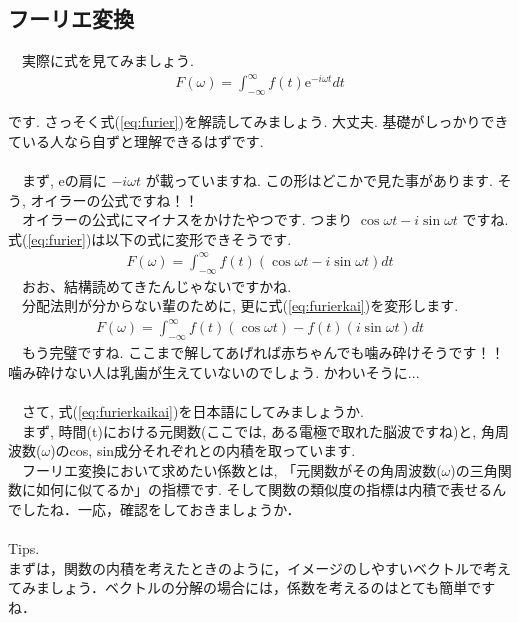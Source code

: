\documentclass[11pt,a4paper,uplatex]{ujreport} 	%
\begin{document}
\subsection{フーリエ変換} 
　実際に式を見てみましょう.\\
\begin{eqnarray}
F(\omega) = \int_{-\infty}^{\infty} f(t)\mathrm{e}^{-i\omega t} dt
\label{eq:furier}
\end{eqnarray}

です. さっそく式(\ref{eq:furier})を解読してみましょう. 大丈夫. 基礎がしっかりできている人なら自ずと理解できるはずです.\\
\\
　まず, eの肩に $ -i\omega t $ が載っていますね. この形はどこかで見た事があります. そう, オイラーの公式ですね！！\\
　オイラーの公式にマイナスをかけたやつです. つまり $ \cos\omega t  - i\sin\omega t $ ですね. \\
式(\ref{eq:furier})は以下の式に変形できそうです.\\
\begin{eqnarray}
F(\omega) = \int_{-\infty}^{\infty} f(t)(\cos\omega t - i\sin\omega t) dt
\label{eq:furierkai}
\end{eqnarray}
　おお、結構読めてきたんじゃないですかね.\\
　分配法則が分からない輩のために, 更に式(\ref{eq:furierkai})を変形します.\\
\begin{eqnarray}
F(\omega) = \int_{-\infty}^{\infty} f(t)(\cos\omega t) - f(t)(i\sin\omega t) dt
\label{eq:furierkaikai}
\end{eqnarray}
　もう完璧ですね. ここまで解してあげれば赤ちゃんでも噛み砕けそうです！！噛み砕けない人は乳歯が生えていないのでしょう. かわいそうに...\\
\\
　さて, 式(\ref{eq:furierkaikai})を日本語にしてみましょうか.\\
　まず, 時間(t)における元関数(ここでは, ある電極で取れた脳波ですね)と, 角周波数($\omega$)のcos, sin成分それぞれとの内積を取っています. 
\\
　フーリエ変換において求めたい係数とは, 「元関数がその角周波数($\omega$)の三角関数に如何に似てるか」の指標です. そして関数の類似度の指標は内積で表せるんでしたね．一応，確認をしておきましょうか．\\
\\
Tips.\\
まずは，関数の内積を考えたときのように，イメージのしやすいベクトルで考えてみましょう．ベクトルの分解の場合には，係数を考えるのはとても簡単ですね．\\
\end{document}
